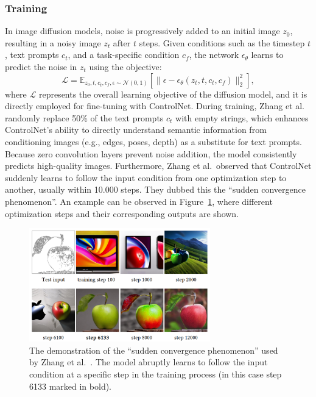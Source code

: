 \subsubsection{Training}
In image diffusion models, noise is progressively added to an initial image $z_0$, resulting in a noisy image $z_t$ after $t$ steps. Given conditions such as the timestep $t$, text prompts $c_t$, and a task-specific condition $c_f$, the network $\epsilon_\theta$ learns to predict the noise in $z_t$ using the objective:
\[
    \mathcal{L} = \mathbb{E}_{z_0, t, c_t, c_f, \epsilon \sim \mathcal{N}(0, 1)} \left[ \| \epsilon - \epsilon_\theta(z_t, t, c_t, c_f) \|_2^2 \right],
\]
where $\mathcal{L}$ represents the overall learning objective of the diffusion model, and it is directly employed for fine-tuning with ControlNet. During training, Zhang et al.~\cite{zhang2023addingconditionalcontroltexttoimage} randomly replace 50\% of the text prompts $c_t$ with empty strings, which enhances ControlNet's ability to directly understand semantic information from conditioning images (e.g., edges, poses, depth) as a substitute for text prompts. Because zero convolution layers prevent noise addition, the model consistently predicts high-quality images. Furthermore, Zhang et al.\ observed that ControlNet suddenly learns to follow the input condition from one optimization step to another, usually within 10.000 steps. They dubbed this the ``sudden convergence phenomenon''. An example can be observed in Figure~\ref{fig:control_net:training_steps}, where different optimization steps and their corresponding outputs are shown.
\begin{figure}[h!]
    \centering
    \includegraphics[width=0.7\textwidth]{assets/control_net_training_steps.pdf}
    \caption{The demonstration of the ``sudden convergence phenomenon'' used by Zhang et al.~\cite{zhang2023addingconditionalcontroltexttoimage}. The model abruptly learns to follow the input condition at a specific step in the training process (in this case step 6133 marked in bold).}
    \label{fig:control_net:training_steps}
\end{figure}
